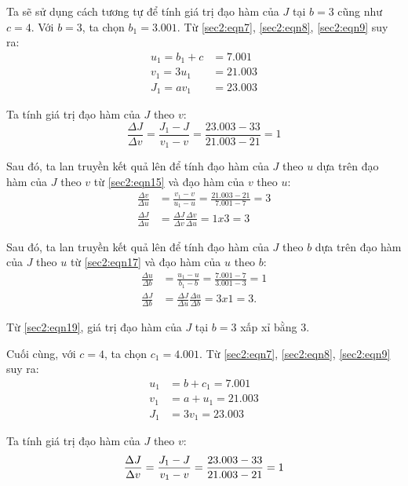 Ta sẽ sử dụng cách tương tự để tính giá trị đạo hàm của $J$ tại $b=3$ cũng như $c=4$. Với $b=3$, ta chọn $b_{1} = 3.001$. Từ \ref{sec2:eqn7}, \ref{sec2:eqn8}, \ref{sec2:eqn9} suy ra:
\begin{align}
u_{1} = b_{1} + c &= 7.001\\
v_{1} = 3u_{1} &= 21.003\\
J_{1} = av_{1} &= 23.003
\end{align}

Ta tính giá trị đạo hàm của $J$ theo $v$:
\begin{equation}
\label{sec2:eqn15}
\frac{\Delta J}{\Delta v} = \frac{J_{1} - J}{v_{1} - v} = \frac{23.003-33}{21.003-21} = 1
\end{equation}

Sau đó, ta lan truyền kết quả lên để tính đạo hàm của $J$ theo $u$ dựa trên đạo hàm của $J$ theo $v$ từ \ref{sec2:eqn15} và đạo hàm của $v$ theo $u$:
\begin{align}
\frac{\Delta v}{\Delta u} &= \frac{v_{1} - v}{u_{1} - u} = \frac{21.003-21}{7.001-7} = 3\\
\label{sec2:eqn17}
\frac{\Delta J}{\Delta u} &= \frac{\Delta J}{\Delta v}\frac{\Delta v}{\Delta u} = 1x3 = 3
\end{align}

Sau đó, ta lan truyền kết quả lên để tính đạo hàm của $J$ theo $b$ dựa trên đạo hàm của $J$ theo $u$ từ \ref{sec2:eqn17} và đạo hàm của $u$ theo $b$:
\begin{align}
\frac{\Delta u}{\Delta b} &= \frac{u_{1} - u}{b_{1} - b} = \frac{7.001-7}{3.001-3} = 1\\
\label{sec2:eqn19}
\frac{\Delta J}{\Delta b} &= \frac{\Delta J}{\Delta u}\frac{\Delta u}{\Delta b} = 3x1=3.
\end{align}

Từ \ref{sec2:eqn19}, giá trị đạo hàm của $J$ tại $b=3$ xấp xỉ bằng 3.

Cuối cùng, với $c=4$, ta chọn $c_{1} = 4.001$. Từ \ref{sec2:eqn7}, \ref{sec2:eqn8}, \ref{sec2:eqn9} suy ra:
\begin{align}
u_{1} &= b + c_{1} = 7.001\\
v_{1} &= a + u_{1} = 21.003\\
J_{1} &= 3v_{1} = 23.003
\end{align}

Ta tính giá trị đạo hàm của $J$ theo $v$:
\begin{equation}
\label{sec2:eqn23}
\frac{\Delta J}{\Delta v} = \frac{J_{1} - J}{v_{1} - v} = \frac{23.003-33}{21.003-21} = 1\\
\end{equation}

